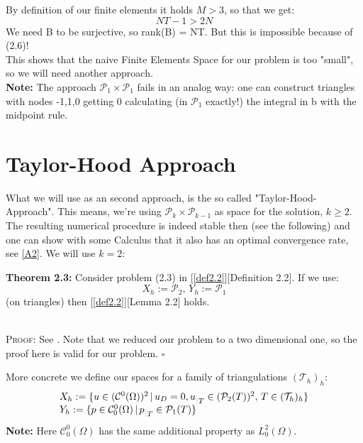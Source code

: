 \documentclass[12pt,a4paper]{report}
\newcommand*{\QEDB}{\null\nobreak\hfill\ensuremath{\square}}
\newcommand{\einschraenkung}{\,\rule[-1pt]{0.1pt}{8pt}\,{}}
\begin{document}
By definition of our finite elements it holds \(M>3\), so that we get:
\begin{equation}
    NT - 1 > 2N
\end{equation}
We need B to be surjective, so rank(B) = NT. But this is impossible because of (2.6)!\\
This shows that the naive Finite Elements Space for our problem is too "small", so we will need another approach.\\
\textbf{Note:} The approach \(\mathcal{P}_1 \times \mathcal{P}_1\) fails in an analog way: one can construct triangles with nodes -1,1,0 getting 0 calculating (in \(\mathcal{P}_1\) exactly!) the integral in b with the midpoint rule.
\newpage
\section{Taylor-Hood Approach}
What we will use as an second approach, is the so called "Taylor-Hood-Approach". This means, we're using \(\mathcal{P}_k \times \mathcal{P}_{k-1}\) as space for the solution, \(k \geq 2\). The resulting numerical procedure is indeed stable then (see the following) and one can show with some Calculus that it also has an optimal convergence rate, see \ref{A2}. We will use \(k=2\):\\
\colorbox{theored}{\begin{minipage}{15cm}{\textcolor{black}{}{\label{theo2.3}}}
\textbf{Theorem 2.3:} Consider problem (2.3) in [\ref{def2.2}][Definition 2.2]. If we use:
\begin{equation}
    X_h := \mathcal{P}_2,\, Y_h := \mathcal{P}_1
\end{equation}
(on triangles) then [\ref{def2.2}][Lemma 2.2] holds.
\end{minipage}}\\

\textsc{Proof:} See \cite{taylorhood}. Note that we reduced our problem to a two dimensional one, so the proof here is valid for our problem. \QEDB

More concrete we define our spaces for a family of triangulations \((\mathcal{T}_h)_h\)\cite{taylorhood}:
\begin{equation}
\begin{array}{l}
X_h := \{u \in (\mathcal{C}^0(\Omega))^2 \,|\, u_D = 0, u_{\einschraenkung T} \in (\mathcal{P}_2(T))^2,\, T \in (\mathcal{T}_h)_h\} \\
Y_h := \{p \in \mathcal{C}^0_0(\Omega)\,|\, p_{\einschraenkung T} \in  \mathcal{P}_1(T)\}
\end{array}
\end{equation}
\textbf{Note:} Here \(\mathcal{C}^0_0(\Omega)\) has the same additional property as \(L^2_0(\Omega)\).
\end{document}
